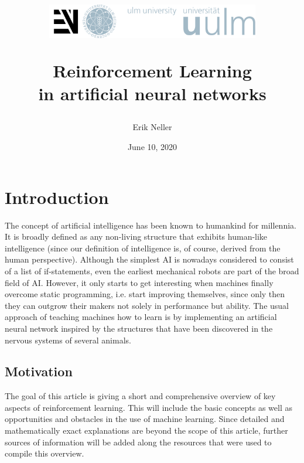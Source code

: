 \documentclass[12pt,a4]{article}
\title{
    \begin{figure}
        \centering
        \includegraphics[height=1.5cm]{logo.png}
    \end{figure}
Reinforcement Learning\\in artificial neural networks
}
\author{Erik Neller}
\date{June 10, 2020}
\begin{document}
\maketitle
\thispagestyle{empty} %
\newpage

\tableofcontents
\newpage

\section{Introduction}
The concept of artificial intelligence has been known to humankind for millennia. It is broadly
defined as any non-living structure that exhibits human-like intelligence (since our definition of intelligence is, of course, derived from the human perspective). Although the simplest AI is nowadays considered to consist of a list of if-statements, even the earliest mechanical robots are part of the broad field of AI.
\citep{wikiTLAI} 
\newline \newline
However, it only starts to get interesting when machines finally overcome static programming, i.e. start improving themselves, since only then they can outgrow their makers not solely in performance but ability. The usual approach of teaching machines how to learn is by implementing an artificial neural network inspired by the structures that have been discovered in the nervous systems of several animals.
\citep{KrieselKNN} \citep{wikiAI}

\subsection{Motivation}
The goal of this article is giving a short and comprehensive overview of key aspects of reinforcement learning. This will include the basic concepts as well as opportunities and obstacles in the use of machine learning. Since detailed and mathematically exact explanations are beyond the scope of this article, further sources of information will be added along the resources that were used to compile this overview.
\end{document}
